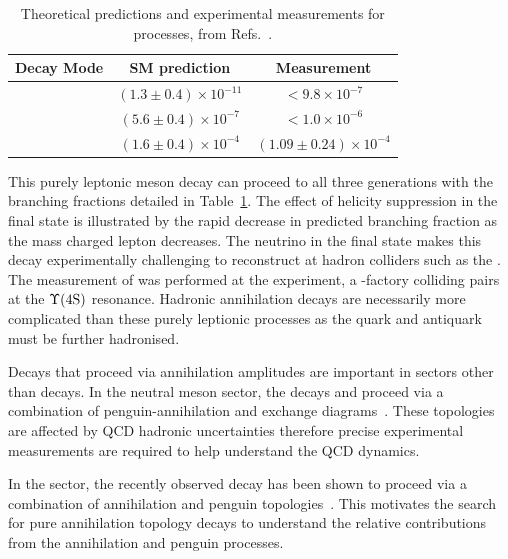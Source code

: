 \begin{table}[h]
   \begin{center}
      \begin{tabular}{lcc}
         \hline

         Decay Mode                 & SM prediction & Measurement \\
         \hline 
         \decay{\Bp}{\ep\neue}      & $(1.3\pm0.4)\times10^{-11}$           & $<9.8\times10^{-7}$\\
         \decay{\Bp}{\mup\neum}     & $(5.6\pm0.4)\times10^{-7}$            & $<1.0\times10^{-6}$\\
         \decay{\Bp}{\taup\neut}    & $(1.6\pm0.4)\times10^{-4}$&           $(1.09\pm0.24)\times 10^{-4}$ \\
         \hline
      \end{tabular}
   \end{center}
   \caption{Theoretical predictions and experimental measurements for \decay{\Bp}{\ellp\neul} processes, from Refs.~\cite{PhysRevD.92.051102,PhysRevD.79.091101,Satoyama:2006xn}.}
   \label{tab:Theory_B2ellnu}
\end{table}
This purely leptonic \Bp meson decay can proceed to all three generations with the branching fractions detailed in Table~\ref{tab:Theory_B2ellnu}. The effect of helicity suppression in the final state is illustrated by the rapid decrease in predicted branching fraction as the mass charged lepton decreases. The neutrino in the final state makes this decay experimentally challenging to reconstruct at hadron colliders such as the \lhc. The measurement of \decay{\Bp}{\taup\neut} was performed at the \belle experiment, a \B-factory colliding \ep\en pairs at the $\Upsilon(\text{4S})$ resonance. 
Hadronic annihilation decays are necessarily more complicated than these purely leptionic processes as the quark and antiquark must be further hadronised.

Decays that proceed via annihilation amplitudes are important in sectors other than \Bp decays. In the neutral \B meson sector, the decays \decay{\Bz}{\Kp\Km} and \decay{\Bs}{\pip\pim} proceed via a combination of penguin-annihilation and exchange diagrams~\cite{PhysRevLett.118.081801}. These topologies are affected by QCD hadronic uncertainties therefore precise experimental measurements are required to help understand the QCD dynamics.

In the \Bc sector, the recently observed \decay{\Bcp}{\Dz\Kp} decay has been shown to proceed via a combination of annihilation and penguin topologies~\cite{LHCb-PAPER-2016-058}. This motivates the search for pure annihilation topology decays to understand the relative contributions from the annihilation and penguin processes.

